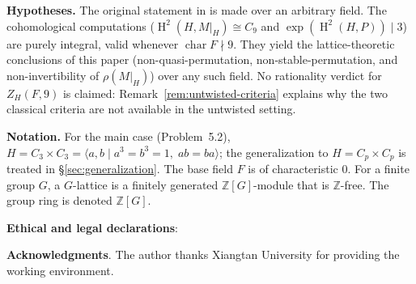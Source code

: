 \documentclass[12pt,a4paper]{article}
\theoremstyle{definition}
\DeclareMathOperator{\Char}{char}
\DeclareMathOperator{\Br}{Br}
\DeclareMathOperator{\coh}{H}
\begin{document}
\medskip\noindent
\textbf{Hypotheses.}
The original statement in \cite[Problem~5.2]{ABGV2011} is made over an
arbitrary field.  The cohomological computations
(\(\coh^2(H, M|_H) \cong C_9\) and \(\exp(\coh^2(H, P)) \mid 3\))
are purely integral, valid whenever \(\Char F \nmid 9\).
They yield the lattice-theoretic conclusions of this paper
(non-quasi-permutation, non-stable-permutation, and non-invertibility of
\(\rho(M|_H)\)) over any such field.  No rationality verdict for
\(Z_H(F,9)\) is claimed: Remark~\ref{rem:untwisted-criteria} explains why
the two classical criteria are not available in the untwisted setting.



\medskip\noindent
\textbf{Notation.} For the main case (Problem~5.2),
\(H = C_3 \times C_3 = \langle a,b \mid a^3 = b^3 = 1,\; ab = ba \rangle\);
the generalization to \(H = C_p \times C_p\) is treated in
\S\ref{sec:generalization}.
The base field \(F\) is of characteristic \(0\).
For a finite group \(G\), a \(G\)-lattice is a finitely generated
\(\mathbb{Z}[G]\)-module that is \(\mathbb{Z}\)-free. The group ring is denoted
\(\mathbb{Z}[G]\).

\medskip\noindent
\textbf{Ethical and legal declarations}: 


\medskip\noindent
\textbf{Acknowledgments}. 
The author thanks Xiangtan University for providing the working environment.
\end{document}

